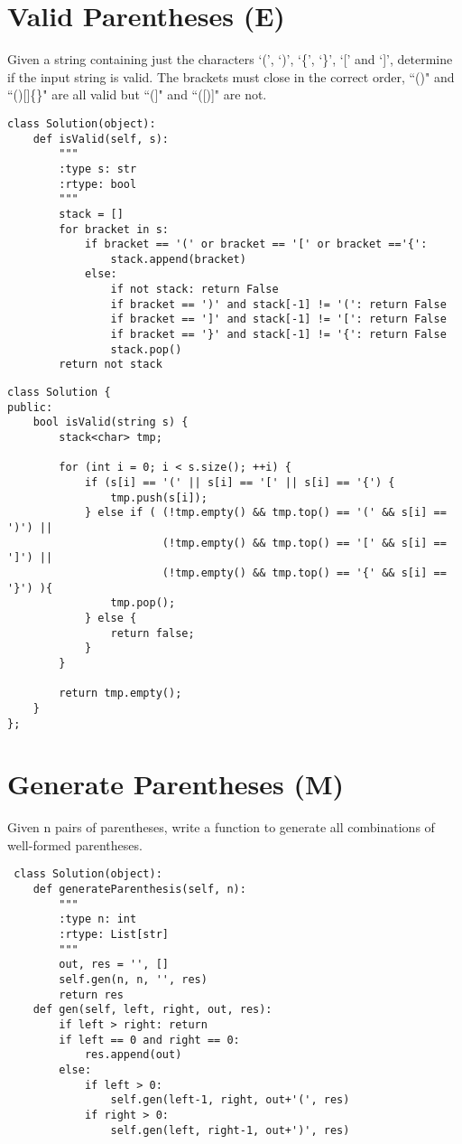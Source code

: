 \section{Valid Parentheses (E)}
Given a string containing just the characters `(', `)', `\{', `\}', `[' and `]', determine if the input string is valid. The brackets must close in the correct order, ``()" and ``()[]\{\}" are all valid but ``(]" and ``([)]" are not.\\

\begin{lstlisting}
class Solution(object):
    def isValid(self, s):
        """
        :type s: str
        :rtype: bool
        """
        stack = []
        for bracket in s:
            if bracket == '(' or bracket == '[' or bracket =='{':
                stack.append(bracket)
            else:
                if not stack: return False
                if bracket == ')' and stack[-1] != '(': return False
                if bracket == ']' and stack[-1] != '[': return False
                if bracket == '}' and stack[-1] != '{': return False
                stack.pop()
        return not stack    
\end{lstlisting}

\begin{lstlisting}
class Solution {
public:
    bool isValid(string s) {
        stack<char> tmp;
        
        for (int i = 0; i < s.size(); ++i) {
            if (s[i] == '(' || s[i] == '[' || s[i] == '{') {
                tmp.push(s[i]);
            } else if ( (!tmp.empty() && tmp.top() == '(' && s[i] == ')') ||
                        (!tmp.empty() && tmp.top() == '[' && s[i] == ']') ||                                               
                        (!tmp.empty() && tmp.top() == '{' && s[i] == '}') ){
                tmp.pop();
            } else {
                return false;
            }
        }
        
        return tmp.empty();
    }
};
\end{lstlisting}


\section{Generate Parentheses (M)}
Given n pairs of parentheses, write a function to generate all combinations of well-formed parentheses. \\
 
 \begin{lstlisting}
 class Solution(object):
    def generateParenthesis(self, n):
        """
        :type n: int
        :rtype: List[str]
        """
        out, res = '', []
        self.gen(n, n, '', res)
        return res
    def gen(self, left, right, out, res):
        if left > right: return
        if left == 0 and right == 0:
            res.append(out)
        else:
            if left > 0:
                self.gen(left-1, right, out+'(', res)
            if right > 0:
                self.gen(left, right-1, out+')', res)
\end{lstlisting}
 
